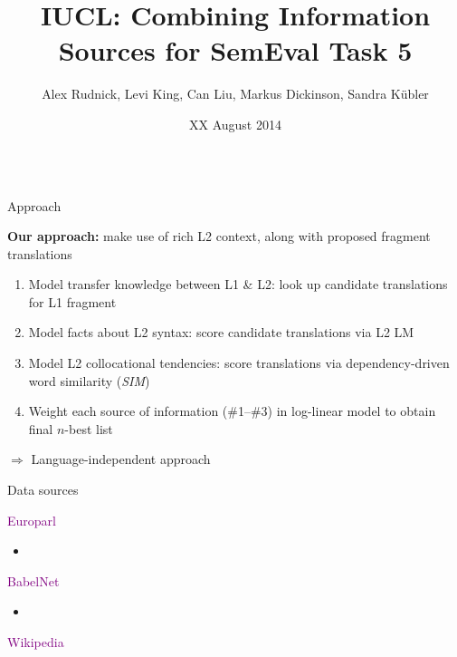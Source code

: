 \documentclass[final,t]{beamer}
\title[]{IUCL: Combining Information Sources for SemEval Task 5}
\author[]{Alex Rudnick, Levi King, Can Liu, Markus Dickinson, Sandra K\"ubler}
\institute[]{Indiana University}
\date[]{XX August 2014}
\begin{document}
\begin{frame}{}
  \begin{columns}[t]
    \begin{column}{.31\linewidth}

\begin{block}{Approach}

  \textbf{Our approach:} make use of rich L2 context, along with
  proposed fragment translations

  \medskip

  \begin{enumerate}
  \item Model transfer knowledge between L1 \& L2: look up candidate
    translations for L1 fragment
  \item Model facts about L2 syntax: score candidate translations via
    L2 LM
  \item Model L2 collocational tendencies: score translations via
    dependency-driven word similarity (\textit{SIM})
  \item Weight each source of information (\#1--\#3) in log-linear
    model to obtain final $n$-best list
  \end{enumerate}

  $\Rightarrow$ Language-independent approach

\end{block}

\begin{block}{Data sources}

\begin{center}
\textcolor{purple}{Europarl}
\end{center}

\colorbox{light-gray}{
\begin{minipage}{.90\linewidth}
\begin{itemize}
\item 
\end{itemize}
\end{minipage}
}

\begin{center}
\textcolor{purple}{BabelNet}
\end{center}

\colorbox{light-gray}{
\begin{minipage}{.90\linewidth}
\begin{itemize}
\item
\end{itemize}
\end{minipage}
}

\begin{center}
\textcolor{purple}{Wikipedia}
\end{center}


\end{block}
\end{column}
\end{columns}
\end{frame}
\end{document}
